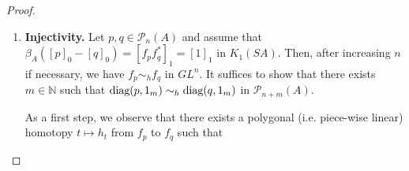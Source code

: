 \documentclass{book}
\newtheorem{lemma}[definition]{Lemma}
\def\diag{\textnormal{diag}}
\begin{document}
\begin{proof}
\begin{enumerate}[label={}]
\begin{enumerate}[label={}]
\begin{lemma}
      \end{lemma}
      \begin{proof}
        \begin{enumerate}
          \item Put \(w=1+(e-e^*)(e^*-e)\). Then \(w\) is positive and invertible, thus \(\rho(e)=e e^* w^{-1}\) is well-defined.
        A straightforward calculation yields \(ew=e e^*=we\) and \(e^* w = e^* e e^*=w e^*\).
          Thus \(e e^* w={(e e^*)}^2\) and \(e e^* w^{-1}=w^{-1}e e^*\).
          This implies that \(e e^* w^{-1}\) is self-adjoint and that
          \[
            {\rho(e)}^2=e e^* w^{-1} e e^* w^{-1}={e e^*}^2 w^{-2}=e e^* w^{-1}=\rho(e)
          \]
          Whence \(\rho(e)\) is a projection.
          \item Clearly, \(\rho\) is a continuous map and \(\rho(p)=p\) if \(p\) is a projection.\par
          To see that \(\rho(e)\sim_h e\) in \(\mathcal{I}(B)\), set \(u_t=1-t(e-\rho(e))\) for \(t\in[0,1]\). Since \(\rho(e)e=e\)
          and \(e\rho(e)=\rho(e)\), we have \({(e-\rho(e))}^2=0\). Therefore \(u_t\) is invertible with inverse \(u_t^{-1}=1+t(e-\rho(e))\). Thus \(u_t^{-1} e u_t\) is an idempotent for all \(t\in[0,1]\), and we have
          \[
            e=u_0^{-1} e u_0\sim_h u_1^{-1} e u_1=(1+(e-\rho(e)))e(1-(e-\rho(e)))=\rho(e).
          \]
          \item If \(t\mapsto e_t\) is a continuous path in \(\mathcal{I}(B)\) from \(e_0=p\) to \(e_1=q\), then \(t\mapsto \rho(e_t)\) is a continuous path in \(\mathcal{P}(B)\) from \(\rho(e_0)=p\) to \(\rho(e_1)=q\).
        \end{enumerate}
      \end{proof}
      Let \(\rho:\mathcal{I}_n (A)\rightarrow\mathcal{P}_n (A)\) be the map defined in Lemma~\ref{lemma:822}
      (with \(B=M_n(A)\)). Then \(\nu(f)=1_n+\rho(e)(z-1)\) yields the desired map \(\nu:PL_1^n\rightarrow PRL^n\).
    \end{enumerate}
    \item \textbf{Injectivity.} Let \(p,q\in\mathcal{P}_n(A)\) and assume that \(\beta_A({[p]}_0-{[q]}_0)={[f_p f_q^*]}_1={[1]}_1\) in \(K_1(S A)\).
    Then, after increasing \(n\) if necessary, we have \(f_p\sim_h f_q\) in \(GL^n\). It suffices to show that there exists \(m\in\mathbb{N}\) such that \(\diag(p,1_m)\sim_h \diag(q,1_m)\) in \(\mathcal{P}_{n+m}(A)\).\par
    As a first step, we observe that there exists a polygonal (i.e. piece-wise linear) homotopy \(t\mapsto h_t\) from \(f_p\) to \(f_q\) such that 

\end{enumerate}
\end{proof}
\end{document}
